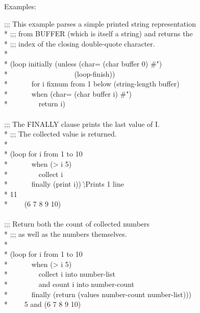 \begin{defloop}
Examples:
\begin{lisp}
;;; This example parses a simple printed string representation  \\*
;;; from BUFFER (which is itself a string) and returns the \\*
;;; index of the closing double-quote character. \\*
\\*
(loop initially (unless (char= (char buffer 0) \#{\Xbackslash}") \\*
~~~~~~~~~~~~~~~~~~(loop-finish)) \\*
~~~~~~for i fixnum from 1 below (string-length buffer) \\*
~~~~~~when (char= (char buffer i) \#{\Xbackslash}") \\*
~~~~~~~~return i) \\
 \\
;;; The FINALLY clause prints the last value of I. \\*
;;; The collected value is returned. \\*
\\*
(loop for i from 1 to 10 \\*
~~~~~~when (> i 5) \\*
~~~~~~~~collect i \\*
~~~~~~finally (print i)) \`;\textrm{Prints 1 line}\\*
11 \\*
~~~\EV~(6 7 8 9 10) \\
 \\
;;; Return both the count of collected numbers \\*
;;; as well as the numbers themselves. \\*
\\*
(loop for i from 1 to 10 \\*
~~~~~~when (> i 5) \\*
~~~~~~~~collect i into number-list \\*
~~~~~~~~and count i into number-count \\*
~~~~~~finally (return (values number-count number-list))) \\*
~~~\EV~5 \textrm{and} (6 7 8 9 10)
\end{lisp}
\end{defloop}

